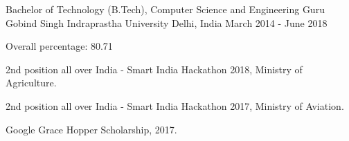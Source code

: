 \begin{cventries}
  \cventry
    {Bachelor of Technology (B.Tech), Computer Science and Engineering} %
    {Guru Gobind Singh Indraprastha University} %
    {Delhi, India} %
    {March 2014 - June 2018} %
    {
      \begin{cvitems} %
        \item {Overall percentage: 80.71}
        \item {2nd position all over India - Smart India Hackathon 2018, Ministry of Agriculture.}
        \item {2nd position all over India - Smart India Hackathon 2017, Ministry of Aviation.}
        \item {Google Grace Hopper Scholarship, 2017.}
      \end{cvitems}
    }

\end{cventries}